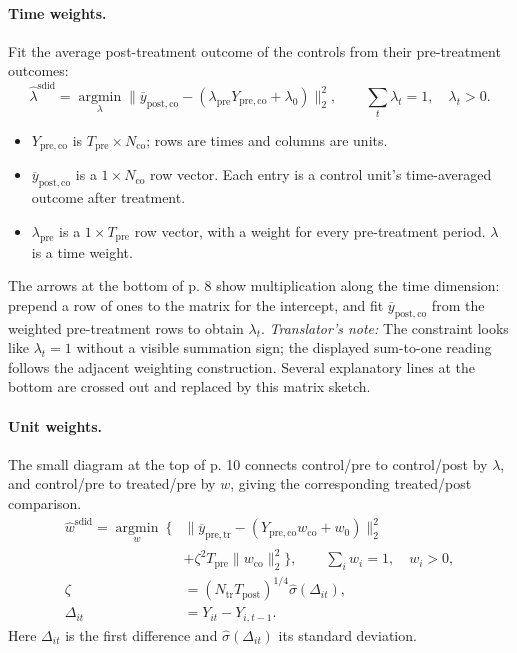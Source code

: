\paragraph{Time weights.}
Fit the average post-treatment outcome of the controls from their pre-treatment outcomes:
\[
\widehat\lambda^{\mathrm{sdid}}
=\operatorname*{argmin}_{\lambda}
\|\overline y_{\mathrm{post,co}}
-(\lambda_{\mathrm{pre}}Y_{\mathrm{pre,co}}+\lambda_0)\|_2^2,
\qquad \sum_t\lambda_t=1,\quad\lambda_t>0.
\]
\begin{itemize}
\item \(Y_{\mathrm{pre,co}}\) is \(T_{\mathrm{pre}}\times N_{\mathrm{co}}\); rows are times and columns are units.
\item \(\overline y_{\mathrm{post,co}}\) is a \(1\times N_{\mathrm{co}}\) row vector. Each entry is a control unit's time-averaged outcome after treatment.
\item \(\lambda_{\mathrm{pre}}\) is a \(1\times T_{\mathrm{pre}}\) row vector, with a weight for every pre-treatment period. \(\lambda\) is a time weight.
\end{itemize}
The arrows at the bottom of p. 8 show multiplication along the time dimension: prepend a row of ones to the matrix for the intercept, and fit \(\overline y_{\mathrm{post,co}}\) from the weighted pre-treatment rows to obtain \(\lambda_t\).
\textit{Translator's note:} The constraint looks like \(\lambda_t=1\) without a visible summation sign; the displayed sum-to-one reading follows the adjacent weighting construction. Several explanatory lines at the bottom are crossed out and replaced by this matrix sketch.

\paragraph{Unit weights.}
The small diagram at the top of p. 10 connects control/pre to control/post by \(\lambda\), and control/pre to treated/pre by \(w\), giving the corresponding treated/post comparison.
\begin{align*}
\widehat w^{\mathrm{sdid}}
=\operatorname*{argmin}_{w}\ \big\{
&\|\overline y_{\mathrm{pre,tr}}
-(Y_{\mathrm{pre,co}}w_{\mathrm{co}}+w_0)\|_2^2\\
&+\zeta^2T_{\mathrm{pre}}\|w_{\mathrm{co}}\|_2^2\big\},
\qquad \sum_iw_i=1,\quad w_i>0,\\
\zeta&=(N_{\mathrm{tr}}T_{\mathrm{post}})^{1/4}
\widehat\sigma(\Delta_{it}),\\
\Delta_{it}&=Y_{it}-Y_{i,t-1}.
\end{align*}
Here \(\Delta_{it}\) is the first difference and \(\widehat\sigma(\Delta_{it})\) its standard deviation.

